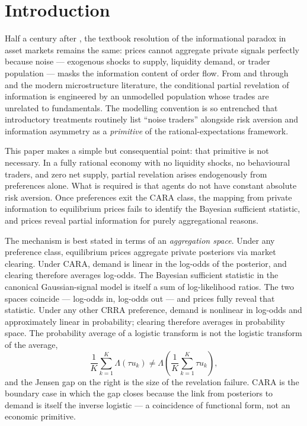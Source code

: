 \documentclass[12pt,letterpaper]{article}
\theoremstyle{definition}
\theoremstyle{remark}
\newcommand{\Lam}{\Lambda}            %
\newcommand{\1}{\mathbf{1}}
\begin{document}
\newpage

\section{Introduction}\label{sec:intro}

Half a century after \citet{GrossmanStiglitz1980}, the textbook resolution of
the informational paradox in asset markets remains the same: prices cannot
aggregate private signals perfectly because noise --- exogenous shocks to
supply, liquidity demand, or trader population --- masks the information
content of order flow. From \citet{Hellwig1980} and \citet{DiamondVerrecchia1981}
through \citet{Kyle1985} and the modern microstructure literature, the
conditional partial revelation of information is engineered by an
unmodelled population whose trades are unrelated to fundamentals. The
modelling convention is so entrenched that introductory treatments routinely
list ``noise traders'' alongside risk aversion and information asymmetry as a
\emph{primitive} of the rational-expectations framework.

This paper makes a simple but consequential point: that primitive is not
necessary. In a fully rational economy with no liquidity shocks, no
behavioural traders, and zero net supply, partial revelation arises
endogenously from preferences alone. What is required is that agents do not
have constant absolute risk aversion. Once preferences exit the CARA class,
the mapping from private information to equilibrium prices fails to identify
the Bayesian sufficient statistic, and prices reveal partial information for
purely aggregational reasons.

The mechanism is best stated in terms of an \emph{aggregation space}. Under
any preference class, equilibrium prices aggregate private posteriors via
market clearing. Under CARA, demand is linear in the log-odds of the
posterior, and clearing therefore averages log-odds. The Bayesian sufficient
statistic in the canonical Gaussian-signal model is itself a sum of
log-likelihood ratios. The two spaces coincide --- log-odds in, log-odds out
--- and prices fully reveal that statistic. Under any other CRRA preference,
demand is nonlinear in log-odds and approximately linear in probability;
clearing therefore averages in probability space. The probability average of
a logistic transform is not the logistic transform of the average,
\[
   \frac{1}{K}\sum_{k=1}^{K}\Lam(\tau u_{k}) \neq
   \Lam\!\left(\frac{1}{K}\sum_{k=1}^{K}\tau u_{k}\right),
\]
and the Jensen gap on the right is the size of the revelation failure.
CARA is the boundary case in which the gap closes because the link from
posteriors to demand is itself the inverse logistic --- a coincidence of
functional form, not an economic primitive.
\end{document}
